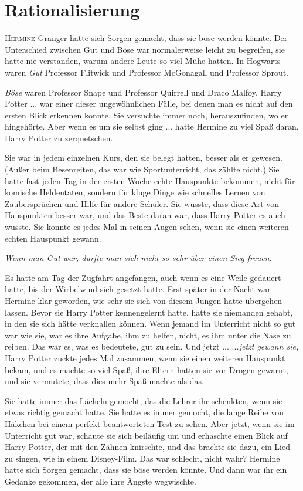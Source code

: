\chapter{Rationalisierung}

\lettrine{H}{ermine} Granger hatte sich Sorgen gemacht, dass sie böse werden
könnte. Der Unterschied zwischen Gut und Böse war normalerweise leicht zu
begreifen, sie hatte nie verstanden, warum andere Leute so viel Mühe hatten. In
Hogwarts waren \glqq{}\emph{Gut}\grqq{} Professor Flitwick und Professor
McGonagall und Professor Sprout.

\glqq{}\emph{Böse}\grqq{} waren Professor Snape und Professor Quirrell und Draco
Malfoy. Harry Potter ... war einer dieser ungewöhnlichen Fälle, bei denen man es
nicht auf den ersten Blick erkennen konnte. Sie versuchte immer noch,
herauszufinden, wo er hingehörte. Aber wenn es um sie selbst ging ... hatte
Hermine zu viel Spaß daran, Harry Potter zu zerquetschen.

Sie war in jedem einzelnen Kurs, den sie belegt hatten, besser als er gewesen.
(Außer beim Besenreiten, das war wie Sportunterricht, das zählte nicht.) Sie
hatte fast jeden Tag in der ersten Woche echte Hauspunkte bekommen, nicht für
komische Heldentaten, sondern für kluge Dinge wie schnelles Lernen von
Zaubersprüchen und Hilfe für andere Schüler. Sie wusste, dass diese Art von
Hauspunkten besser war, und das Beste daran war, dass Harry Potter es auch
wusste. Sie konnte es jedes Mal in seinen Augen sehen, wenn sie einen weiteren
echten Hauspunkt gewann.

\emph{Wenn man Gut war, durfte man sich nicht so sehr über einen Sieg freuen.}

Es hatte am Tag der Zugfahrt angefangen, auch wenn es eine Weile gedauert hatte,
bis der Wirbelwind sich gesetzt hatte. Erst später in der Nacht war Hermine klar
geworden, wie sehr sie sich von diesem Jungen hatte übergehen lassen. Bevor sie
Harry Potter kennengelernt hatte, hatte sie niemanden gehabt, in den sie sich
hätte verknallen können. Wenn jemand im Unterricht nicht so gut war wie sie, war
es ihre Aufgabe, ihm zu helfen, nicht, es ihm unter die Nase zu reiben. Das war
es, was es bedeutete, gut zu sein. Und jetzt ... ..\emph{.jetzt gewann sie,}
Harry Potter zuckte jedes Mal zusammen, wenn sie einen weiteren Hauspunkt bekam,
und es machte so viel Spaß, ihre Eltern hatten sie vor Drogen gewarnt, und sie
vermutete, dass dies mehr Spaß machte als das.

Sie hatte immer das Lächeln gemocht, das die Lehrer ihr schenkten, wenn sie
etwas richtig gemacht hatte. Sie hatte es immer gemocht, die lange Reihe von
Häkchen bei einem perfekt beantworteten Test zu sehen. Aber jetzt, wenn sie im
Unterricht gut war, schaute sie sich beiläufig um und erhaschte einen Blick auf
Harry Potter, der mit den Zähnen knirschte, und das brachte sie dazu, ein Lied
zu singen, wie in einem Disney-Film. Das war schlecht, nicht wahr? Hermine hatte
sich Sorgen gemacht, dass sie böse werden könnte. Und dann war ihr ein Gedanke
gekommen, der alle ihre Ängste wegwischte.

